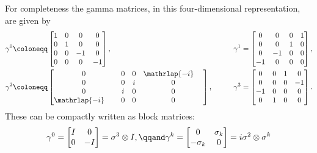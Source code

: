\documentclass[fleqn]{NotesClass}
\newcommand*{\ident}{I}
\begin{document}
    For completeness the gamma matrices, in this four-dimensional representation, are given by
    \begin{alignat}{3}
        \gamma^0 &\coloneqq 
        \begin{bmatrix}
            1 & 0 & 0 & 0\\
            0 & 1 & 0 & 0\\
            0 & 0 & -1 & 0\\
            0 & 0 & 0 & -1
        \end{bmatrix}
        , \qquad &
        \gamma^1 &= 
        \begin{bmatrix}
            0 & 0 & 0 & 1\\
            0 & 0 & 1 & 0\\
            0 & -1 & 0 & 0\\
            -1 & 0 & 0 & 0
        \end{bmatrix}
        ,\\
        \gamma^2 &\coloneqq 
        \begin{bmatrix}
            0 & 0 & 0 & \mathrlap{-i}\hphantom{-1}\\
            0 & 0 & i & 0\\
            0 & i & 0 & 0\\
            \mathrlap{-i}\hphantom{-1} & 0 & 0 & 0
        \end{bmatrix}
        , \qquad &
        \gamma^3 &= 
        \begin{bmatrix}
            0 & 0 & 1 & 0\\
            0 & 0 & 0 & -1\\
            -1 & 0 & 0 & 0\\
            0 & 1 & 0 & 0
        \end{bmatrix}
        .
    \end{alignat}
    These can be compactly written as block matrices:
    \begin{equation}
        \gamma^0 = 
        \begin{bmatrix}
            \ident & 0\\
            0 & -\ident
        \end{bmatrix}
        = \sigma^3 \otimes \ident
        , \qqand
        \gamma^k = 
        \begin{bmatrix}
            0 & \sigma_k\\
            -\sigma_k & 0
        \end{bmatrix}
        = i\sigma^2 \otimes \sigma^k
    \end{equation}
\end{document}
